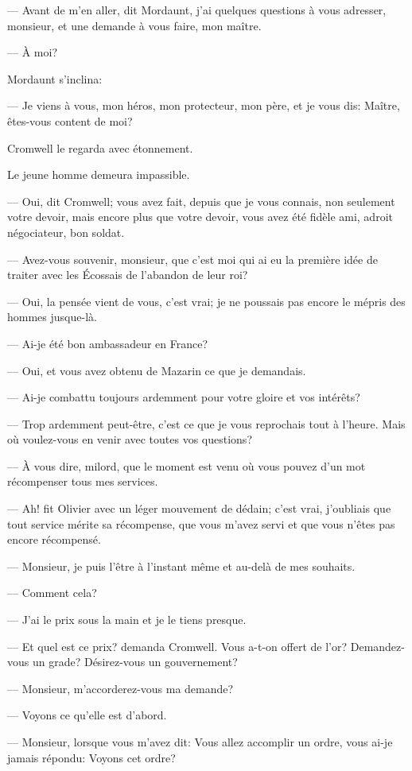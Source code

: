— Avant de m'en aller, dit Mordaunt, j'ai quelques questions à vous adresser, monsieur, et une demande à vous faire, mon maître.

— À moi?

Mordaunt s'inclina:

— Je viens à vous, mon héros, mon protecteur, mon père, et je vous dis: Maître, êtes-vous content de moi?

Cromwell le regarda avec étonnement.

Le jeune homme demeura impassible.

— Oui, dit Cromwell; vous avez fait, depuis que je vous connais, non seulement votre devoir, mais encore plus que votre devoir, vous avez été fidèle ami, adroit négociateur, bon soldat.

— Avez-vous souvenir, monsieur, que c'est moi qui ai eu la première idée de traiter avec les Écossais de l'abandon de leur roi?

— Oui, la pensée vient de vous, c'est vrai; je ne poussais pas encore le mépris des hommes jusque-là.

— Ai-je été bon ambassadeur en France?

— Oui, et vous avez obtenu de Mazarin ce que je demandais.

— Ai-je combattu toujours ardemment pour votre gloire et vos intérêts?

— Trop ardemment peut-être, c'est ce que je vous reprochais tout à l'heure. Mais où voulez-vous en venir avec toutes vos questions?

— À vous dire, milord, que le moment est venu où vous pouvez d'un mot récompenser tous mes services.

— Ah! fit Olivier avec un léger mouvement de dédain; c'est vrai, j'oubliais que tout service mérite sa récompense, que vous m'avez servi et que vous n'êtes pas encore récompensé.

— Monsieur, je puis l'être à l'instant même et au-delà de mes souhaits.

— Comment cela?

— J'ai le prix sous la main et je le tiens presque.

— Et quel est ce prix? demanda Cromwell. Vous a-t-on offert de l'or? Demandez-vous un grade? Désirez-vous un gouvernement?

— Monsieur, m'accorderez-vous ma demande?

— Voyons ce qu'elle est d'abord.

— Monsieur, lorsque vous m'avez dit: Vous allez accomplir un ordre, vous ai-je jamais répondu: Voyons cet ordre?

